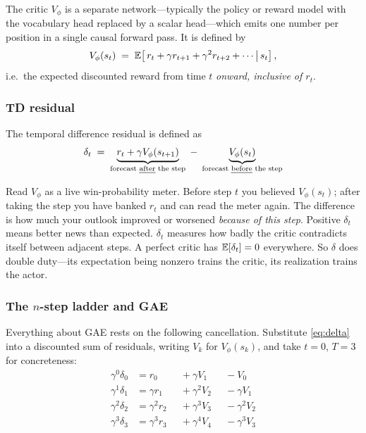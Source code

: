 The critic $V_\phi$ is a separate network---typically the policy or reward model
with the vocabulary head replaced by a scalar head---which emits one number per
position in a single causal forward pass. It is defined by
%
\begin{equation}
  V_{\phi}(s_t) \;=\; \mathbb{E}\!\left[\, r_t + \gamma r_{t+1} + \gamma^2 r_{t+2} + \cdots \,\middle|\, s_t \right],
  \label{eq:vdef}
\end{equation}
%
i.e.\ the expected discounted reward from time $t$ \emph{onward, inclusive of
$r_t$}. 

\subsubsection{TD residual}

The temporal difference residual is defined as
\begin{equation}
    \delta_t \;=\; \underbrace{r_t + \gamma V_{\phi}(s_{t+1})}_{\text{forecast \emph{after} the step}}
               \;-\; \underbrace{V_{\phi}(s_t)}_{\text{forecast \emph{before} the step}}
    \label{eq:delta}
  \end{equation}
   
  Read $V_\phi$ as a live win-probability meter. Before step $t$ you believed
  $V_{\phi}(s_t)$; after taking the step you have banked $r_t$ and can read the meter
  again. The difference is how much your outlook improved or worsened
  \emph{because of this step}. Positive $\delta_t$ means better news than expected. 
   $\delta_t$ measures how badly the
    critic contradicts itself between adjacent steps. A perfect critic has
    $\mathbb{E}[\delta_t]=0$ everywhere. So $\delta$ does double duty---its expectation being
    nonzero trains the critic, its realization trains the actor.

\subsubsection{The $n$-step ladder and GAE}

Everything about GAE rests on the following cancellation. Substitute
\eqref{eq:delta} into a discounted sum of residuals, writing $V_{k}$ for
$V_\phi(s_k)$, and take $t=0$, $T=3$ for concreteness:
%
\begin{equation}
\begin{aligned}
\gamma^0\delta_0 &= r_0        &&+\ \gamma V_{1}   &&-\ V_{0}\\
\gamma^1\delta_1 &= \gamma r_1 &&+\ \gamma^2 V_{2} &&-\ \gamma V_{1}\\
\gamma^2\delta_2 &= \gamma^2 r_2 &&+\ \gamma^3 V_{3} &&-\ \gamma^2 V_{2}\\
\gamma^3\delta_3 &= \gamma^3 r_3 &&+\ \gamma^4 V_{4} &&-\ \gamma^3 V_{3}
\end{aligned}
\label{eq:telescope-rows}
\end{equation}

